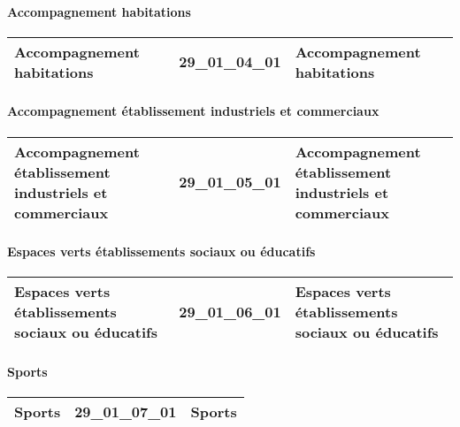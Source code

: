\documentclass[12pt,titlepage,oneside]{book}
\begin{document}
\paragraph{Accompagnement habitations}
\noindent
\vspace{\baselineskip}

\renewcommand{\arraystretch}{1.2}
\begin{supertabular}{|p{10cm}|c|p{15cm}|}
 Accompagnement habitations & 29\_01\_04\_01 & Accompagnement habitations\\
\hline
\end{supertabular}


\paragraph{Accompagnement établissement industriels et commerciaux}
\noindent
\vspace{\baselineskip}

\renewcommand{\arraystretch}{1.2}
\begin{supertabular}{|p{10cm}|c|p{15cm}|}
 Accompagnement établissement industriels et commerciaux & 29\_01\_05\_01 & Accompagnement établissement industriels et commerciaux\\
\hline
\end{supertabular}


\paragraph{Espaces verts établissements sociaux ou éducatifs}
\noindent
\vspace{\baselineskip}

\renewcommand{\arraystretch}{1.2}
\begin{supertabular}{|p{10cm}|c|p{15cm}|}
 Espaces verts établissements sociaux ou éducatifs & 29\_01\_06\_01 & Espaces verts établissements sociaux ou éducatifs\\
\hline
\end{supertabular}


\paragraph{Sports}
\noindent
\vspace{\baselineskip}

\renewcommand{\arraystretch}{1.2}
\begin{supertabular}{|p{10cm}|c|p{15cm}|}
 Sports & 29\_01\_07\_01 & Sports\\
\hline
\end{supertabular}
\end{document}
